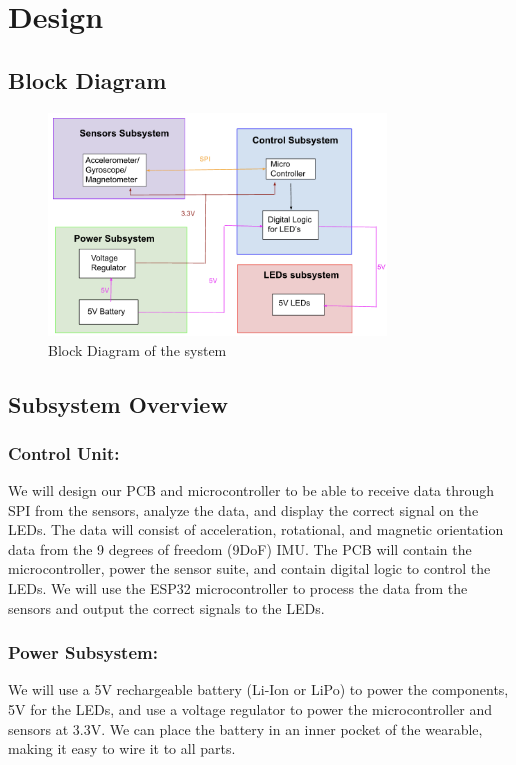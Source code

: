 \documentclass[12pt]{article}
\begin{document}
\newpage
\section{Design}
\subsection{Block Diagram}
\begin{figure}[ht]
    \centering
    \includegraphics[width=0.8\textwidth]{block_diagram.png}
    \caption{Block Diagram of the system}
    \label{fig:my_label1}
\end{figure}
\subsection{Subsystem Overview}
    \subsubsection{Control Unit:} 
    We will design our PCB and microcontroller to be able to 
    receive data through SPI from the sensors, analyze the data, 
    and display the correct signal on the LEDs. The data will 
    consist of acceleration, rotational, and magnetic orientation
    data from the 9 degrees of freedom (9DoF) IMU. The PCB will 
    contain the microcontroller, power the sensor suite, and 
    contain digital logic to control the LEDs. We will use the 
    ESP32 microcontroller \cite{EspressifESP32} to process the data from the sensors 
    and output the correct signals to the LEDs. 
    \subsubsection{Power Subsystem:} 
	We will use a 5V rechargeable battery (Li-Ion or LiPo) to 
    power the components, 5V for the LEDs, and use a voltage 
    regulator \cite{DiodesIncorporatedAP2112} to power the microcontroller and sensors at 3.3V. 
    We can place the battery in an inner pocket of the wearable,
     making it easy to wire it to all parts. 
\end{document}
